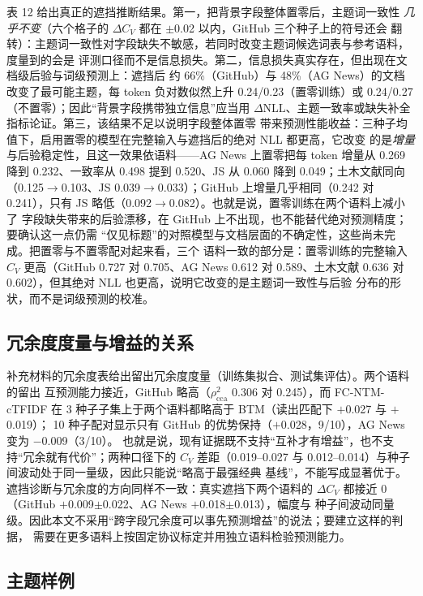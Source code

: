 \documentclass{article}
\begin{document}
表 12 给出真正的遮挡推断结果。第一，把背景字段整体置零后，主题词一致性
\emph{几乎不变}（六个格子的 $\Delta C_V$ 都在 $\pm$0.02 以内，GitHub 三个种子上的符号还会
翻转）：主题词一致性对字段缺失不敏感，若同时改变主题词候选词表与参考语料，度量到的会是
评测口径而不是信息损失。第二，信息损失真实存在，但出现在文档级后验与词级预测上：遮挡后
约 66\%（GitHub）与 48\%（AG News）的文档改变了最可能主题，每 token 负对数似然上升
0.24/0.23（置零训练）或 0.24/0.27（不置零）；因此“背景字段携带独立信息”应当用
$\Delta\mathrm{NLL}$、主题一致率或缺失补全指标论证。第三，该结果不足以说明字段整体置零
带来预测性能收益：三种子均值下，启用置零的模型在完整输入与遮挡后的绝对 NLL 都更高，它改变
的是\emph{增量}与后验稳定性，且这一效果依语料——AG News 上置零把每 token 增量从 0.269
降到 0.232、一致率从 0.498 提到 0.520、JS 从 0.060 降到 0.049；土木文献同向
（0.125$\rightarrow$0.103、JS 0.039$\rightarrow$0.033）；GitHub 上增量几乎相同（0.242 对
0.241），只有 JS 略低（0.092$\rightarrow$0.082）。也就是说，置零训练在两个语料上减小了
字段缺失带来的后验漂移，在 GitHub 上不出现，也不能替代绝对预测精度；要确认这一点仍需
“仅见标题”的对照模型与文档层面的不确定性，这些尚未完成。把置零与不置零配对起来看，三个
语料一致的部分是：置零训练的完整输入 $C_V$ 更高（GitHub 0.727 对 0.705、AG News 0.612 对
0.589、土木文献 0.636 对 0.602），但其绝对 NLL 也更高，说明它改变的是主题词一致性与后验
分布的形状，而不是词级预测的校准。

\subsection{冗余度度量与增益的关系}



补充材料的冗余度表给出留出冗余度度量（训练集拟合、测试集评估）。两个语料的留出
互预测能力接近，GitHub 略高（$\rho^2_{\mathrm{cca}}$ 0.306 对 0.245），而
FC-NTM-cTFIDF 在 3 种子子集上于两个语料都略高于 BTM（读出匹配下 $+$0.027 与 $+$0.019）；
10 种子配对显示只有 GitHub 的优势保持（$+$0.028，9/10），AG News 变为 $-$0.009（3/10）。
也就是说，现有证据既不支持“互补才有增益”，也不支持“冗余就有代价”；两种口径下的 $C_V$
差距（0.019--0.027 与 0.012--0.014）与种子间波动处于同一量级，因此只能说“略高于最强经典
基线”，不能写成显著优于。遮挡诊断与冗余度的方向同样不一致：真实遮挡下两个语料的
$\Delta C_V$ 都接近 0（GitHub $+$0.009$\pm$0.022、AG News $+$0.018$\pm$0.013），幅度与
种子间波动同量级。因此本文不采用“跨字段冗余度可以事先预测增益”的说法；要建立这样的判据，
需要在更多语料上按固定协议标定并用独立语料检验预测能力。


\subsection{主题样例}
\end{document}
